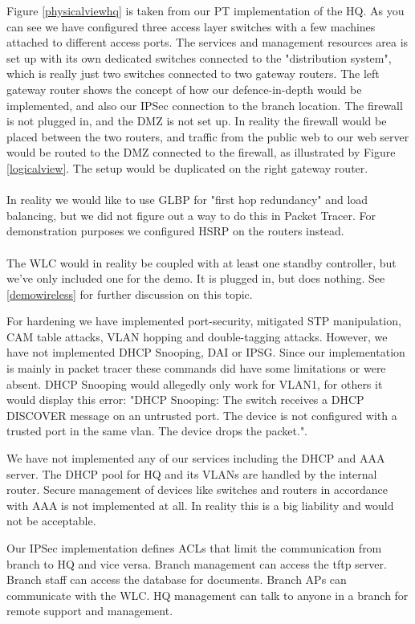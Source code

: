Figure \ref{physicalviewhq} is taken from our PT implementation of the HQ. As you can see we have configured three access layer switches with a few machines attached to different access ports. The services and management resources area is set up with its own dedicated switches connected to the "distribution system", which is really just two switches connected to two gateway routers. The left gateway router shows the concept of how our defence-in-depth would be implemented, and also our IPSec connection to the branch location. The firewall is not plugged in, and the DMZ is not set up. In reality the firewall would be placed between the two routers, and traffic from the public web to our web server would be routed to the DMZ connected to the firewall, as illustrated by Figure \ref{logicalview}. The setup would be duplicated on the right gateway router.
\\
\\
In reality we would like to use GLBP for "first hop redundancy" and load balancing, but we did not figure out a way to do this in Packet Tracer. For demonstration purposes we configured HSRP on the routers instead.
\\
\\
The WLC would in reality be coupled with at least one standby controller, but we've only included one for the demo. It is plugged in, but does nothing. See \ref{demowireless} for further discussion on this topic.


For hardening we have implemented port-security, mitigated STP manipulation, CAM table attacks, VLAN hopping and double-tagging attacks. However, we have not implemented DHCP Snooping, DAI or IPSG. Since our implementation is mainly in packet tracer these commands did have some limitations or were absent. DHCP Snooping would allegedly only work for VLAN1, for others it would display this error: "DHCP Snooping: The switch receives a DHCP DISCOVER message on an untrusted port. The device is not configured with a trusted port in the same vlan.  The device drops the packet.".

We have not implemented any of our services including the DHCP and AAA server. The DHCP pool for HQ and its VLANs are handled by the internal router. Secure management of devices like switches and routers in accordance with AAA is not implemented at all. In reality this is a big liability and would not be acceptable.

Our IPSec implementation defines ACLs that limit the communication from branch to HQ and vice versa. Branch management can access the tftp server. Branch staff can access the database for documents. Branch APs can communicate with the WLC. HQ management can talk to anyone in a branch for remote support and management.


